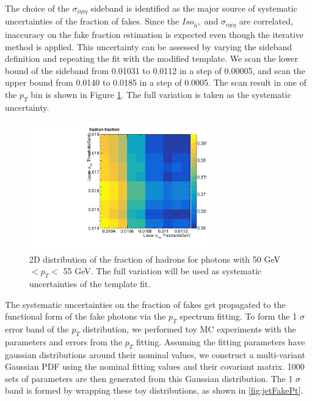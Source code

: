 \documentclass[thesis.tex]{subfiles}
\renewcommand\_{\textunderscore\allowbreak}
\begin{document}
The choice of the $\sigma_{i\eta i\eta}$ sideband is identified as the major source of systematic uncertainties of the fraction of fakes. Since the $Iso_{h^\pm}$ and $\sigma_{i\eta i\eta}$ are correlated, inaccuracy on the fake fraction estimation is expected even though the iterative method is applied. This uncertainty can be assessed by varying the sideband definition and repeating the fit with the modified template. We scan the lower bound of the sideband from 0.01031 to 0.0112 in a step of 0.00005, and scan the upper bound from 0.0140 to 0.0185 in a step of 0.0005. The scan result in one of the $p_T$ bin is shown in Figure \ref{fig:jetfakeSys}. The full variation is taken as the systematic uncertainty. 

\begin{figure}[!hbt]
  \centering
    \includegraphics[width=0.7\textwidth]{Figures/can2D-50-55_ChIso-DoubleEG-ReMiniAOD.pdf}
  \caption{2D distribution of the fraction of hadrons for photons with 50 GeV $< p_T <$ 55 GeV. The full variation will be used as systematic uncertainties of the template fit.}
    \label{fig:jetfakeSys}
\end{figure}


The systematic uncertainties on the fraction of fakes get propagated to the functional form of the fake photons via the $p_T$ spectrum fitting. To form the 1 $\sigma$ error band of the $p_T$ distribution, we performed toy MC experiments with the parameters and errors from the $p_T$ fitting. Assuming the fitting parameters have gaussian distributions around their nominal values, we construct a multi-variant Gaussian PDF using the nominal fitting values and their covariant matrix. 1000 sets of parameters are then generated from this Gaussian distribution. The 1 $\sigma$ band is formed by wrapping these toy distributions, as shown  in \ref{fig:jetFakePt}. 
\end{document}
